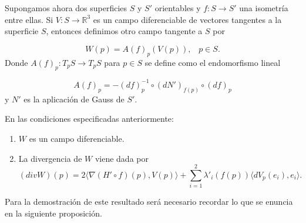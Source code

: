 Supongamos ahora dos superficies $S$ y $S'$ orientables  y $f : S \to S'$ una isometría entre ellas. Si $V : S \to \mathbb{R}^3$ es un campo diferenciable de vectores tangentes a la superficie $S$, entonces definimos otro campo tangente a $S$ por

	\[
		W(p) = A(f)_p(V(p)), \;\;\; p \in S.
	\]
Donde $A(f)_p : T_p S \to T_p S$ para $p \in S$ se define como el endomorfismo lineal

	\[
		A(f)_p = -(df)^{-1}_{p} \circ (dN')_{f(p)} \circ (df)_p
	\]
y $N'$ es la aplicación de Gauss de $S'$.
${ }$\\

\begin{lema} \label{lem:lema1}
	En las condiciones especificadas anteriormente:
	\begin{enumerate}
		\item $W$ es un campo diferenciable.
		\item La divergencia de $W$ viene dada por 
		\[
			(div W)(p) = 2 \langle \nabla (H' \circ f)(p), V(p) \rangle + \sum_{i=1}^{2} \lambda'_{i}(f(p)) \langle dV_p(e_i), e_i \rangle.
		\]
	\end{enumerate}
	
\end{lema}


	${ }$\\
	
	Para la demostración de este resultado será necesario recordar lo que se enuncia en la siguiente proposición.
	${ }$\\
	
